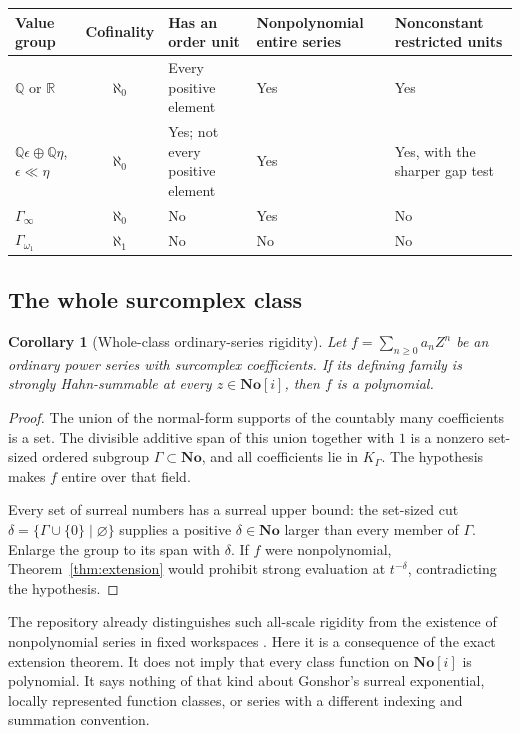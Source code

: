 \documentclass[11pt,letterpaper]{article}
\numberwithin{equation}{section}
\newtheorem{corollary}[theorem]{Corollary}
\theoremstyle{definition}
\theoremstyle{remark}
\newcommand{\No}{\mathbf{No}}
\newcommand{\R}{\mathbb R}
\newcommand{\Q}{\mathbb Q}
\begin{document}
\begin{center}\small
\begin{tabularx}{\textwidth}{@{}p{}cYYY@{}}
\toprule
Value group & Cofinality & Has an order unit & Nonpolynomial entire series & Nonconstant restricted units\\\midrule
$\Q$ or $\R$ & $\aleph_0$ & Every positive element & Yes & Yes\\[0.45em]
$\Q\epsilon\oplus\Q\eta$, $\epsilon\ll\eta$ & $\aleph_0$ & Yes; not every positive element & Yes & Yes, with the sharper gap test\\[0.45em]
$\Gamma_\infty$ & $\aleph_0$ & No & Yes & No\\[0.45em]
$\Gamma_{\omega_1}$ & $\aleph_1$ & No & No & No\\
\bottomrule
\end{tabularx}
\end{center}

\subsection{The whole surcomplex class}
\begin{corollary}[Whole-class ordinary-series rigidity]
\label{cor:whole-class}
Let $f=\sum_{n\ge0}a_nZ^n$ be an ordinary power series with surcomplex
coefficients. If its defining family is strongly Hahn-summable at every
$z\in\No[i]$, then $f$ is a polynomial.
\end{corollary}
\begin{proof}
The union of the normal-form supports of the countably many coefficients is
a set. The divisible additive span of this union together with $1$ is a
nonzero set-sized ordered subgroup $\Gamma\subset\No$, and all coefficients
lie in $K_\Gamma$.
The hypothesis makes $f$ entire over that field.

Every set of surreal numbers has a surreal upper bound: the set-sized cut
$\delta=\{\Gamma\cup\{0\}\mid\varnothing\}$ supplies a positive
$\delta\in\No$ larger than every member of $\Gamma$. Enlarge the group
to its span with $\delta$. If $f$ were nonpolynomial,
Theorem~\ref{thm:extension} would prohibit strong evaluation at $t^{-\delta}$,
contradicting the hypothesis.
\end{proof}

The repository already distinguishes such all-scale rigidity from the
existence of nonpolynomial series in fixed workspaces \cite{RepoMap,RepoRankOne}.
Here it is a consequence of the exact extension theorem. It does not imply
that every class function on $\No[i]$ is polynomial. It says nothing of that
kind about Gonshor's surreal exponential, locally represented function
classes, or series with a different indexing and summation convention.
\end{document}

